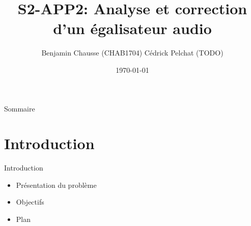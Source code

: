\documentclass[11pt]{beamer}
\title{S2-APP2: Analyse et correction d'un égalisateur audio}
\author{
		Benjamin Chausse (CHAB1704)
		Cédrick Pelchat (TODO)     \\
}
\date{\today}
\institute{Université de Sherbrooke}
\begin{document}
\maketitle

\begin{frame}{Sommaire}
	\tableofcontents
\end{frame}

\section{Introduction}
\begin{frame}{Introduction}
	\begin{itemize}
		\item Présentation du problème
		\item Objectifs
		\item Plan
	\end{itemize}
\end{frame}
\end{document}

